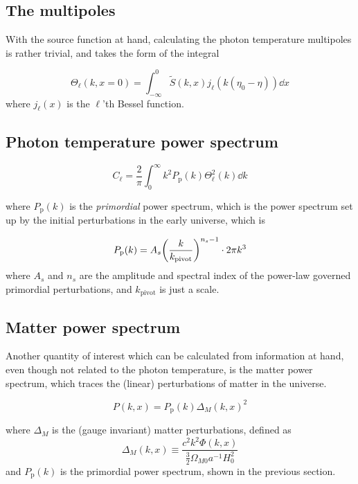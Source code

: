 \documentclass[10pt, a4paper]{article}
\begin{document}
\subsection{The multipoles}
With the source function at hand, calculating the photon temperature multipoles is rather trivial, and takes the form of the integral

\begin{equation}
    \Theta_{\ell}(k, x=0)=\int_{-\infty}^{0} \tilde{S}(k, x) j_{\ell}\left(k\left(\eta_{0}-\eta\right)\right) \dd{x}
\end{equation}
where $j_\ell(x)$ is the $\ell$'th Bessel function.


\subsection{Photon temperature power spectrum}

\begin{equation}
    C_{\ell}=\frac{2}{\pi} \int_0^\infty k^{2} P_{\text {p}}(k) \Theta_{\ell}^{2}(k) \dd{k}
\end{equation}

where $P_\text{p}(k)$ is the \textit{primordial} power spectrum, which is the power spectrum set up by the initial perturbations in the early universe, which is

\begin{equation}
    P_\text{p}(k) = A_s \qty(\frac{k}{k_\text{pivot}})^{n_s-1} \cdot 2\pi k^3
\end{equation}
where $A_s$ and $n_s$ are the amplitude and spectral index of the power-law governed primordial perturbations, and $k_\text{pivot}$ is just a scale.



\subsection{Matter power spectrum}
Another quantity of interest which can be calculated from information at hand, even though not related to the photon temperature, is the matter power spectrum, which traces the (linear) perturbations of matter in the universe.

\begin{equation}
    P(k, x) = P_{\text {p}}(k) \Delta_{M}(k, x)^{2}
\end{equation}

where $\Delta_M$ is the (gauge invariant) matter perturbations, defined as
\begin{equation}
    \Delta_{M}(k, x) \equiv \frac{c^{2} k^{2} \Phi(k, x)}{\frac{3}{2} \Omega_{M 0} a^{-1} H_{0}^{2}}
\end{equation}
and $P_\text{p}(k)$ is the primordial power spectrum, shown in the previous section.
\end{document}
